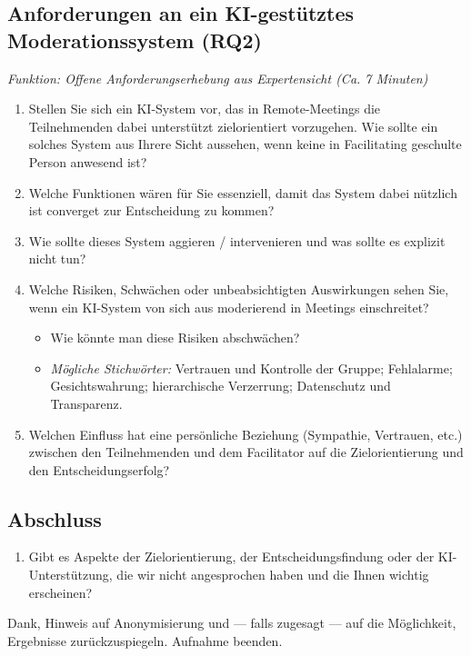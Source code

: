 \subsection*{Anforderungen an ein KI-gestütztes Moderationssystem (RQ2)}
\textit{Funktion: Offene Anforderungserhebung aus Expertensicht (Ca. 7 Minuten)}

\begin{enumerate}[label=6.\arabic*, leftmargin=*]
  \item Stellen Sie sich ein KI-System vor, das in Remote-Meetings die Teilnehmenden
    dabei unterstützt zielorientiert vorzugehen. Wie sollte ein solches System aus Ihrere Sicht aussehen,
    wenn keine in Facilitating geschulte Person anwesend ist?
  \item Welche Funktionen wären für Sie essenziell, damit das System dabei nützlich ist converget zur
    Entscheidung zu kommen?
  \item Wie sollte dieses System aggieren / intervenieren und was sollte es explizit nicht tun?
  \item Welche Risiken, Schwächen oder unbeabsichtigten Auswirkungen sehen Sie, wenn ein
    KI-System von sich aus moderierend in Meetings einschreitet?
    \begin{itemize}[label=\textendash]
      \item Wie könnte man diese Risiken abschwächen?
      \item \textit{Mögliche Stichwörter:} Vertrauen und Kontrolle der
        Gruppe; Fehlalarme; Gesichtswahrung; hierarchische Verzerrung; Datenschutz und
        Transparenz.
    \end{itemize}
  \item Welchen Einfluss hat eine persönliche Beziehung (Sympathie, Vertrauen, etc.) zwischen den
    Teilnehmenden und dem Facilitator auf die Zielorientierung und den Entscheidungserfolg?
\end{enumerate}

\subsection*{Abschluss}

\begin{enumerate}[label=7.\arabic*, leftmargin=*]
  \item Gibt es Aspekte der Zielorientierung, der Entscheidungsfindung oder der
    KI-Unterstützung, die wir nicht angesprochen haben und die Ihnen wichtig erscheinen?
\end{enumerate}

\medskip
Dank, Hinweis auf Anonymisierung und --- falls zugesagt --- auf die Möglichkeit, Ergebnisse
zurückzuspiegeln. Aufnahme beenden.
